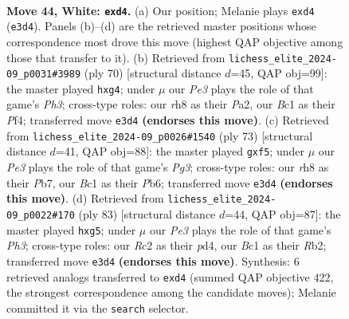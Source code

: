 \documentclass[11pt]{article}
\begin{document}
\clearpage

\begin{figure}[p]\centering
\begin{subfigure}{0.46\textwidth}\centering
\resizebox{\linewidth}{!}{%
\newchessgame
\chessboard[
  setfen={7r/r3k3/1pp3p1/6p1/Pp1pK3/4P3/2R5/2B5 w - - 0 44},
  showmover=false,
  pgfstyle=straightmove, color=movearrow, markmove={e3-d4}
]}
\caption{}
\end{subfigure}\hfill
\begin{subfigure}{0.46\textwidth}\centering
\resizebox{\linewidth}{!}{%
\newchessgame
\chessboard[
  setfen={1r5k/p3RR2/2pp2p1/8/5PpK/7P/PP1r4/8 w - - 0 36},
  showmover=false,
  pgfstyle=straightmove, color=movearrow, markmove={h3-g4}
]}
\caption{}
\end{subfigure}
\\[4pt]
\begin{subfigure}{0.46\textwidth}\centering
\resizebox{\linewidth}{!}{%
\newchessgame
\chessboard[
  setfen={8/1p6/1p4p1/pB3Pk1/P2b4/5P1P/3r4/4R2K b - - 0 37},
  showmover=false,
  pgfstyle=straightmove, color=movearrow, markmove={g6-f5}
]}
\caption{}
\end{subfigure}\hfill
\begin{subfigure}{0.46\textwidth}\centering
\resizebox{\linewidth}{!}{%
\newchessgame
\chessboard[
  setfen={8/1p6/7p/3R1pP1/3Pp1k1/4P1P1/1r4P1/5K2 b - - 0 42},
  showmover=false,
  pgfstyle=straightmove, color=movearrow, markmove={h6-g5}
]}
\caption{}
\end{subfigure}
\caption{\textbf{Move 44, White: \texttt{exd4}.} (a) Our position; Melanie plays \texttt{exd4} (\texttt{e3d4}). Panels (b)--(d) are the retrieved master positions whose correspondence most drove this move (highest QAP objective among those that transfer to it). (b) Retrieved from \texttt{lichess\_elite\_2024-09\_p0031\#3989} (ply 70) [structural distance $d$=45, QAP obj=99]: the master played \texttt{hxg4}; under $\mu$ our \emph{Pe3} plays the role of that game's \emph{Ph3}; cross-type roles: our \emph{r}h8 as their \emph{P}a2, our \emph{B}c1 as their \emph{P}f4; transferred move \texttt{e3d4} \textbf{(endorses this move)}. (c) Retrieved from \texttt{lichess\_elite\_2024-09\_p0026\#1540} (ply 73) [structural distance $d$=41, QAP obj=88]: the master played \texttt{gxf5}; under $\mu$ our \emph{Pe3} plays the role of that game's \emph{Pg3}; cross-type roles: our \emph{r}h8 as their \emph{P}b7, our \emph{B}c1 as their \emph{P}b6; transferred move \texttt{e3d4} \textbf{(endorses this move)}. (d) Retrieved from \texttt{lichess\_elite\_2024-09\_p0022\#170} (ply 83) [structural distance $d$=44, QAP obj=87]: the master played \texttt{hxg5}; under $\mu$ our \emph{Pe3} plays the role of that game's \emph{Ph3}; cross-type roles: our \emph{R}c2 as their \emph{p}d4, our \emph{B}c1 as their \emph{R}b2; transferred move \texttt{e3d4} \textbf{(endorses this move)}. Synthesis: 6 retrieved analogs transferred to \texttt{exd4} (summed QAP objective 422, the strongest correspondence among the candidate moves); Melanie committed it via the \texttt{search} selector.}
\label{fig:thought-m86}
\end{figure}
\end{document}
